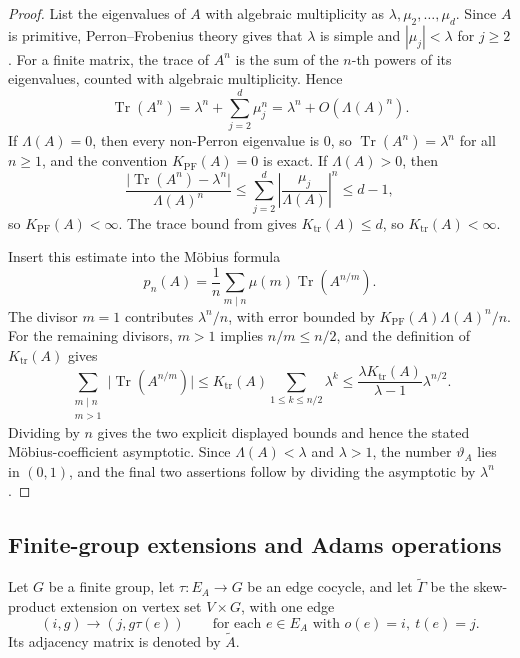 \documentclass[11pt,a4paper]{amsart}
\theoremstyle{plain}
\theoremstyle{definition}
\theoremstyle{remark}
\DeclareMathOperator{\Tr}{Tr}
\newcommand{\abs}[1]{\lvert #1 \rvert}
\begin{document}
\begin{proof}
  List the eigenvalues of \(A\) with algebraic multiplicity as
  \(\lambda,\mu_2,\dots,\mu_d\). Since \(A\) is primitive,
  Perron--Frobenius theory \cite{Seneta2006NonnegativeMatrices} gives that
  \(\lambda\) is simple and
  \(|\mu_j|<\lambda\) for \(j\ge 2\). For a finite matrix,
  the trace of \(A^n\) is the sum of the \(n\)-th powers of its
  eigenvalues, counted with algebraic multiplicity. Hence
  \[
    \Tr(A^n)
    =
    \lambda^n+\sum_{j=2}^d\mu_j^n
    =
    \lambda^n+O(\Lambda(A)^n).
  \]
  If \(\Lambda(A)=0\), then every non-Perron eigenvalue is \(0\), so
  \(\Tr(A^n)=\lambda^n\) for all \(n\ge 1\), and the convention
  \(K_{\mathrm{PF}}(A)=0\) is exact. If \(\Lambda(A)>0\), then
  \[
    \frac{\abs{\Tr(A^n)-\lambda^n}}{\Lambda(A)^n}
    \le
    \sum_{j=2}^d\left|\frac{\mu_j}{\Lambda(A)}\right|^n
    \le d-1,
  \]
  so \(K_{\mathrm{PF}}(A)<\infty\). The trace bound from
   gives \(K_{\mathrm{tr}}(A)\le d\), so
  \(K_{\mathrm{tr}}(A)<\infty\).

  Insert this estimate into the M\"obius formula
  \[
    p_n(A)=\frac{1}{n}\sum_{m\mid n}\mu(m)\Tr(A^{n/m}).
  \]
  The divisor \(m=1\) contributes \(\lambda^n/n\), with error bounded
  by \(K_{\mathrm{PF}}(A)\Lambda(A)^n/n\). For the remaining divisors,
  \(m>1\) implies \(n/m\le n/2\), and the definition of
  \(K_{\mathrm{tr}}(A)\) gives
  \[
    \sum_{\substack{m\mid n\\ m>1}}\abs{\Tr(A^{n/m})}
    \le
    K_{\mathrm{tr}}(A)\sum_{1\le k\le n/2}\lambda^k
    \le
    \frac{\lambda K_{\mathrm{tr}}(A)}{\lambda-1}\lambda^{n/2}.
  \]
  Dividing by \(n\) gives the two explicit displayed bounds and hence
  the stated M\"obius-coefficient asymptotic.
  Since \(\Lambda(A)<\lambda\) and \(\lambda>1\), the number
  \(\vartheta_A\) lies in \((0,1)\), and the final two assertions follow
  by dividing the asymptotic by \(\lambda^n\).
\end{proof}

\subsection{Finite-group extensions and Adams operations}

Let \(G\) be a finite group, let \(\tau:E_A\to G\) be an edge cocycle,
and let \(\widetilde\Gamma\) be the skew-product extension on vertex set
\(V\times G\), with one edge
\[
  (i,g)\longrightarrow (j,g\tau(e))
  \qquad \text{for each } e\in E_A \text{ with } o(e)=i,\ t(e)=j.
\]
Its adjacency matrix is denoted by \(\widetilde A\).
\end{document}
